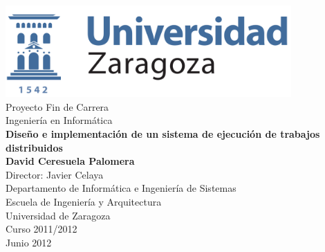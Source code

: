 \documentclass[11pt, twoside]{book}
\makeatletter
\def\cleardoublepageempty{\clearpage\if@twoside \ifodd\c@page\else
    \hbox{}
    \thispagestyle{empty}
    \newpage
    \if@twocolumn\hbox{}\newpage\fi\fi\fi}
\def\bibname{Bibliografía}
\def\listtablename{Índice de tablas}
\makeatother
\begin{document}

\renewcommand{\listtablename}{Índice de tablas}
\renewcommand{\bibname}{Bibliografía}

\begin{titlepage} 
\begin{center} 
 
\includegraphics*[height=3.5cm]{imagenes/logo.png}\\ 

\vspace*{1.5cm} 
{\large Proyecto Fin de Carrera}\\ 
\vspace*{0.2cm} 
{\large Ingeniería en Informática}\\ 
\vspace*{1.5cm} 
{\huge \textbf{Diseño e implementación de un sistema de ejecución de trabajos distribuidos\\}}
\vspace*{2cm} 
{\Large \textbf{David Ceresuela Palomera\\}}
\vspace*{2cm} 
{\normalsize Director: Javier Celaya}\\ 
\vspace*{1.5cm} 
{\normalsize Departamento de Informática e Ingeniería de Sistemas}\\ 
{Escuela de Ingeniería y Arquitectura}\\ 
{Universidad de Zaragoza}\\ 
\vspace*{3.5cm} 
{\normalsize Curso 2011/2012}\\ 
{\normalsize Junio 2012}\\ 
\end{center} 
\end{titlepage} 

\cleardoublepageempty


\frontmatter %



\tableofcontents
\end{document}
